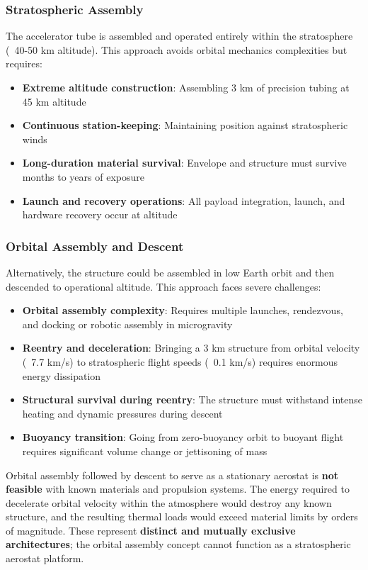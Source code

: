 \begin{itemize}
\subsubsection{Stratospheric Assembly}
The accelerator tube is assembled and operated entirely within the stratosphere (~40-50 km altitude). This approach avoids orbital mechanics complexities but requires:
\begin{itemize}
    \item \textbf{Extreme altitude construction}: Assembling 3 km of precision tubing at 45 km altitude
    \item \textbf{Continuous station-keeping}: Maintaining position against stratospheric winds
    \item \textbf{Long-duration material survival}: Envelope and structure must survive months to years of exposure
    \item \textbf{Launch and recovery operations}: All payload integration, launch, and hardware recovery occur at altitude
\end{itemize}

\subsubsection{Orbital Assembly and Descent}
Alternatively, the structure could be assembled in low Earth orbit and then descended to operational altitude. This approach faces severe challenges:
\begin{itemize}
    \item \textbf{Orbital assembly complexity}: Requires multiple launches, rendezvous, and docking or robotic assembly in microgravity
    \item \textbf{Reentry and deceleration}: Bringing a 3 km structure from orbital velocity (~7.7 km/s) to stratospheric flight speeds (~0.1 km/s) requires enormous energy dissipation
    \item \textbf{Structural survival during reentry}: The structure must withstand intense heating and dynamic pressures during descent
    \item \textbf{Buoyancy transition}: Going from zero-buoyancy orbit to buoyant flight requires significant volume change or jettisoning of mass
\end{itemize}
Orbital assembly followed by descent to serve as a stationary aerostat is \textbf{not feasible} with known materials and propulsion systems. The energy required to decelerate orbital velocity within the atmosphere would destroy any known structure, and the resulting thermal loads would exceed material limits by orders of magnitude. These represent \textbf{distinct and mutually exclusive architectures}; the orbital assembly concept cannot function as a stratospheric aerostat platform.


\end{itemize}
